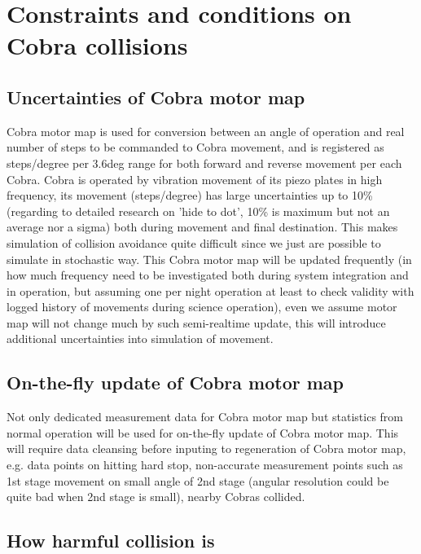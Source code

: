 \documentclass[a4paper,notitlepage]{article}
\begin{document}
\section{Constraints and conditions on Cobra collisions}

\subsection{Uncertainties of Cobra motor map}

Cobra motor map is used for conversion between an angle of operation and 
real number of steps to be commanded to Cobra movement, and is registered 
as steps/degree per 3.6deg range for both forward and reverse movement per 
each Cobra. Cobra is operated by vibration movement of its piezo plates in 
high frequency, its movement (steps/degree) has large uncertainties up to 
10\% (regarding to detailed research on 'hide to dot', 10\% is maximum but 
not an average nor a sigma) both during movement and final destination. 
This makes simulation of collision avoidance quite difficult since we just 
are possible to simulate in stochastic way. 
This Cobra motor map will be updated frequently (in how much frequency need 
to be investigated both during system integration and in operation, but 
assuming one per night operation at least to check validity with logged 
history of movements during science operation), even we assume motor map 
will not change much by such semi-realtime update, this will introduce 
additional uncertainties into simulation of movement. 

\subsection{On-the-fly update of Cobra motor map}

Not only dedicated measurement data for Cobra motor map but statistics from 
normal operation will be used for on-the-fly update of Cobra motor map. This 
will require data cleansing before inputing to regeneration of Cobra motor 
map, e.g. data points on hitting hard stop, non-accurate measurement points 
such as 1st stage movement on small angle of 2nd stage (angular resolution 
could be quite bad when 2nd stage is small), nearby Cobras collided. 

\subsection{How harmful collision is}
\end{document}
